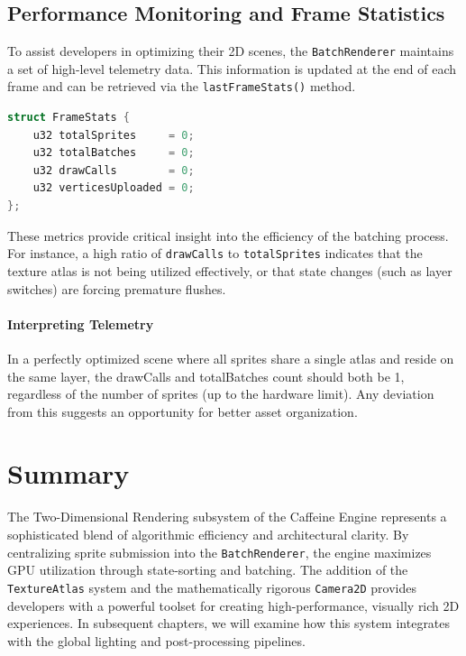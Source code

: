 \subsection{Performance Monitoring and Frame Statistics}

To assist developers in optimizing their 2D scenes, the \texttt{BatchRenderer} maintains a set of high-level telemetry data. This information is updated at the end of each frame and can be retrieved via the \texttt{lastFrameStats()} method.

\begin{lstlisting}[style=code, language=C++, caption={FrameStats telemetry structure}]
struct FrameStats {
    u32 totalSprites     = 0;
    u32 totalBatches     = 0;
    u32 drawCalls        = 0;
    u32 verticesUploaded = 0;
};
\end{lstlisting}

These metrics provide critical insight into the efficiency of the batching process. For instance, a high ratio of \texttt{drawCalls} to \texttt{totalSprites} indicates that the texture atlas is not being utilized effectively, or that state changes (such as layer switches) are forcing premature flushes.


\paragraph{Interpreting Telemetry}

In a perfectly optimized scene where all sprites share a single atlas and reside on the same layer, the drawCalls and totalBatches count should both be 1, regardless of the number of sprites (up to the hardware limit). Any deviation from this suggests an opportunity for better asset organization.



\section{Summary}

The Two-Dimensional Rendering subsystem of the Caffeine Engine represents a sophisticated blend of algorithmic efficiency and architectural clarity. By centralizing sprite submission into the \texttt{BatchRenderer}, the engine maximizes GPU utilization through state-sorting and batching. The addition of the \texttt{TextureAtlas} system and the mathematically rigorous \texttt{Camera2D} provides developers with a powerful toolset for creating high-performance, visually rich 2D experiences. In subsequent chapters, we will examine how this system integrates with the global lighting and post-processing pipelines.
